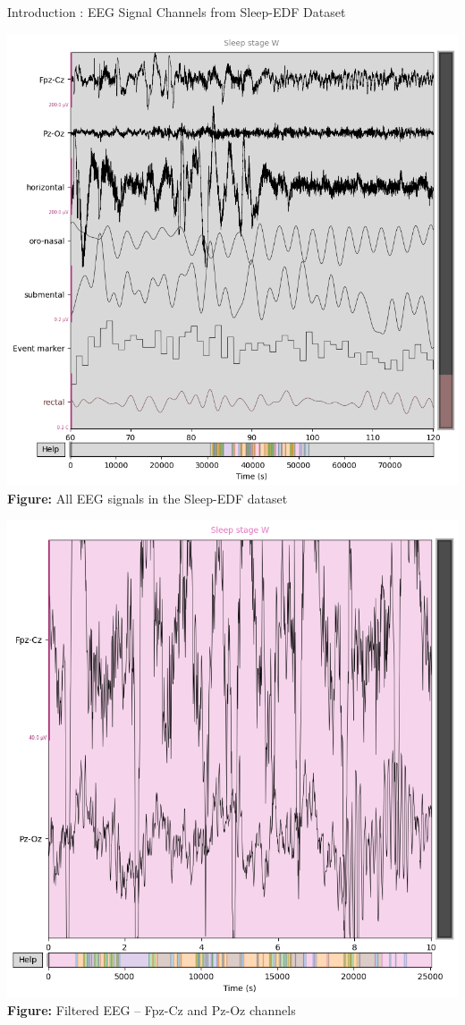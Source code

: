 \begin{frame}{Introduction : EEG Signal Channels from Sleep-EDF Dataset}
	\centering
	\begin{minipage}{0.45\linewidth}
		\centering
		\includegraphics[width=\linewidth]{images/paper_1/EDF Signals}
		\vspace{0.5em}
		\small\textbf{Figure:} All EEG signals in the Sleep-EDF dataset
	\end{minipage}
	\hfill
	\begin{minipage}{0.43\linewidth}
		\centering
		\includegraphics[width=\linewidth]{images/paper_1/EEG_Filter_chanel}
		\vspace{0.5em}
		\small\textbf{Figure:} Filtered EEG – Fpz-Cz and Pz-Oz channels
	\end{minipage}
\end{frame}
